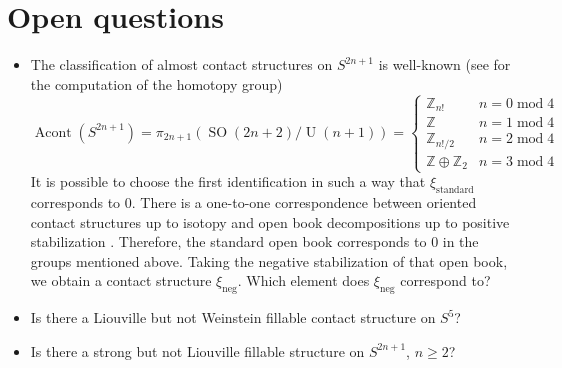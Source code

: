 \documentclass{amsart}
\begin{document}
\section*{Open questions}
\begin{itemize}
    \item The classification of almost contact structures on $S^{2n+1}$ is well-known (see \cite{Harris63} for the computation of the homotopy group)
    \[
        \operatorname{Acont}\left(S^{2n+1}\right) = \pi_{2n+1}(\operatorname{SO}(2n + 2)/\operatorname{U}(n + 1)) = \begin{cases}
            \mathbb Z_{n!} &n = 0 \operatorname{mod} 4\\
            \mathbb Z &n = 1 \operatorname{mod} 4\\
            \mathbb Z_{n!/2} &n = 2 \operatorname{mod} 4\\
            \mathbb Z \oplus \mathbb Z_2 &n = 3 \operatorname{mod} 4
        \end{cases}
    \]
    It is possible to choose the first identification in such a way that $\xi_{\mathrm{standard}}$ corresponds to $0$.
    There is a one-to-one correspondence between oriented contact structures up to isotopy
    and open book decompositions up to positive stabilization \cite{Giroux02}.
    Therefore, the standard open book corresponds to $0$ in the groups mentioned above.
    Taking the negative stabilization of that open book, we obtain a contact structure $\xi_\mathrm{neg}$. Which element does $\xi_\mathrm{neg}$ correspond to?
    \item Is there a Liouville but not Weinstein fillable contact structure on $S^5$?
    \item Is there a strong but not Liouville fillable structure on $S^{2n+1}$, $n \ge 2$?
\end{itemize}
\newpage


\end{document}
